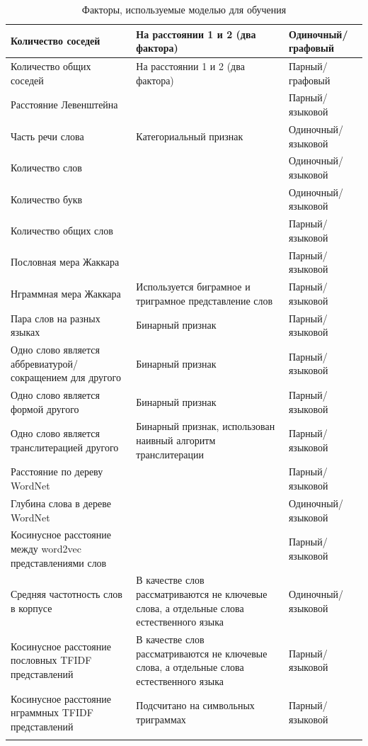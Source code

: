 \begin{longtable}{|p{5cm}|p{4cm}|p{5cm}|}
        Количество соседей & На расстоянии 1 и 2 (два фактора) & Одиночный/графовый \\ \hline
        Количество общих соседей & На расстоянии 1 и 2 (два фактора) & Парный/графовый \\ \hline
        Расстояние Левенштейна & & Парный/языковой \\ \hline
        Часть речи слова & Категориальный признак & Одиночный/языковой \\ \hline
        Количество слов  & & Одиночный/языковой \\ \hline
        Количество букв & & Одиночный/языковой \\ \hline
        Количество общих слов & & Парный/языковой \\ \hline
        Пословная мера Жаккара & & Парный/языковой \\ \hline
        Нграммная мера Жаккара & Используется биграмное и триграмное представление слов & Парный/языковой \\ \hline
        Пара слов на разных языках & Бинарный признак & Парный/языковой \\ \hline
        Одно слово является аббревиатурой/сокращением  для другого & Бинарный признак & Парный/языковой \\ \hline
        Одно слово является формой другого & Бинарный признак & Парный/языковой \\ \hline
        Одно слово является транслитерацией другого & Бинарный признак, использован наивный алгоритм транслитерации & Парный/языковой \\ \hline
        Расстояние по дереву WordNet & & Парный/языковой \\ \hline
        Глубина слова в дереве WordNet & & Одиночный/языковой \\ \hline
        Косинусное расстояние между word2vec представлениями слов & & Парный/языковой \\ \hline
        Средняя частотность слов в корпусе & В качестве слов рассматриваются не ключевые слова, а отдельные слова естественного языка  & Одиночный/языковой \\ \hline
        Косинусное расстояние пословных TFIDF представлений & В качестве слов рассматриваются не ключевые слова, а отдельные слова естественного языка & Парный/языковой \\ \hline
        Косинусное расстояние нграммных TFIDF представлений & Подсчитано на символьных триграммах & Парный/языковой \\ \hline

\caption{Факторы, используемые моделью для обучения} \label{tbl:features}
\end{longtable}


